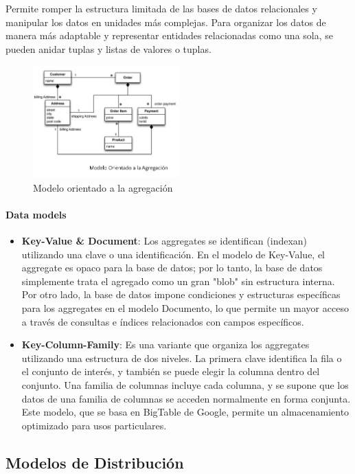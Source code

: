 \documentclass{article}
\begin{document}
		Permite romper la estructura limitada de las bases de datos relacionales y manipular los datos en unidades más complejas. Para organizar los datos de manera más adaptable y representar entidades relacionadas como una sola, se pueden anidar tuplas y listas de valores o tuplas.
		
		\begin{figure}[h]
			\centering
			\includegraphics[width=0.5\textwidth]{aggregates.png}
			\caption{Modelo orientado a la agregación}
		\end{figure}
		
		\paragraph{Data models}
		\begin{itemize}
			\item {\textbf{Key-Value \& Document}}: Los aggregates se identifican (indexan) utilizando una clave o una identificación. En el modelo de Key-Value, el aggregate es opaco para la base de datos; por lo tanto, la base de datos simplemente trata el agregado como un gran "blob" sin estructura interna. Por otro lado, la base de datos impone condiciones y estructuras específicas para los aggregates en el modelo Documento, lo que permite un mayor acceso a través de consultas e índices relacionados con campos específicos.
			
			\item {\textbf{Key-Column-Family}}: Es una variante que organiza los aggregates utilizando una estructura de dos niveles. La primera clave identifica la fila o el conjunto de interés, y también se puede elegir la columna dentro del conjunto. Una familia de columnas incluye cada columna, y se supone que los datos de una familia de columnas se acceden normalmente en forma conjunta. Este modelo, que se basa en BigTable de Google, permite un almacenamiento optimizado para usos particulares.
		\end{itemize}
		\subsection{Modelos de Distribución}
\end{document}
